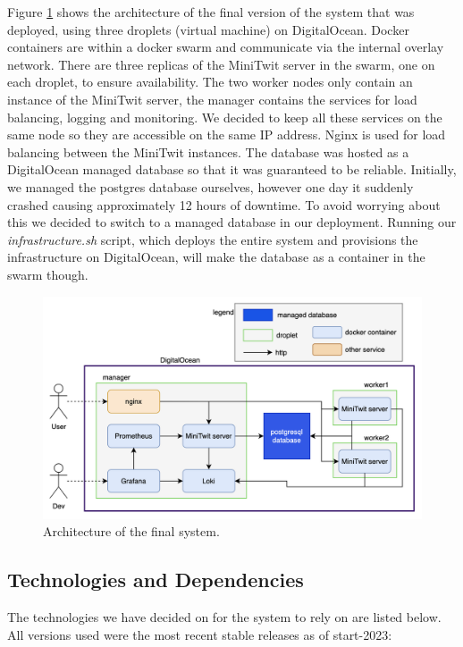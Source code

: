 Figure \ref{fig:architecture} shows the architecture of the final version of the system that was deployed, using three droplets (virtual machine) on DigitalOcean. Docker containers are within a docker swarm and communicate via the internal overlay network. There are three replicas of the MiniTwit server in the swarm, one on each droplet, to ensure availability. The two worker nodes only contain an instance of the MiniTwit server, the manager contains the services for load balancing, logging and monitoring. We decided to keep all these services on the same node so they are accessible on the same IP address. Nginx is used for load balancing between the MiniTwit instances. The database was hosted as a DigitalOcean managed database so that it was guaranteed to be reliable. Initially, we managed the postgres database ourselves, however one day it suddenly crashed causing approximately 12 hours of downtime. To avoid worrying about this we decided to switch to a managed database in our deployment. Running our \textit{infrastructure.sh} script, which deploys the entire system and provisions the infrastructure on DigitalOcean, will make the database as a container in the swarm though.

\begin{figure}[H]
    \centering
    \includegraphics[width=\textwidth]{images/architecture.png}
    \caption{Architecture of the final system.}
    \label{fig:architecture}
\end{figure}

\subsection{Technologies and Dependencies}

The technologies we have decided on for the system to rely on are listed below. All versions used were the most recent stable releases as of start-2023:

